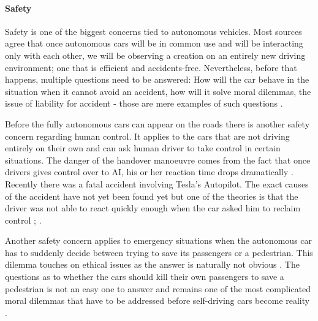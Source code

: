 \documentclass[11pt,english,twoside]{article}
\begin{document}




\paragraph{Safety}

Safety is one of the biggest concerns tied to autonomous vehicles. Most sources agree that once autonomous cars will be in common use and will be interacting only with each other, we will be observing a creation on an entirely new driving environment; one that is efficient and accidents-free. Nevertheless, before that happens, multiple questions need to be answered: How will the car behave in the situation when it cannot avoid an accident, how will it solve moral dilemmas, the issue of liability for accident  - those are mere examples of such questions \citep{techtimes}. 
 


\par
Before the fully autonomous cars can appear on the roads there is another safety concern regarding human control. It applies to the cars that are not driving entirely on their own and can ask human driver to take control in certain situations. The danger of the handover manoeuvre comes from the fact that once drivers gives control over to AI, his or her reaction time drops dramatically \citep{merat2009drivers}. Recently there was a fatal accident involving Tesla's Autopilot. The exact causes of the accident have not yet been found yet but one of the theories is that the driver was not able to react quickly enough when the car asked him to reclaim control \citep{teslacrash}; \citep{tesla4}. 

\par
Another safety concern applies to emergency situations when the autonomous car has to suddenly decide between trying to save its passengers or a pedestrian. This dilemma touches on ethical issues as the answer is naturally not obvious \citep{qz}. The questions as to whether the cars should kill their own passengers to save a pedestrian is not an easy one to answer and remains one of the most complicated moral dilemmas that have to be addressed before self-driving cars become reality \citep{bonnefon2015autonomous}.
\end{document}
